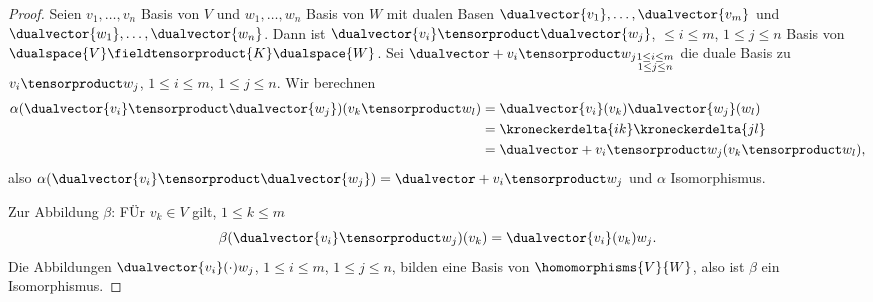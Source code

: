 \begin{proof}
  Seien \( v_1,\dotsc,v_n \) Basis von \( V \) und \( w_1,\dotsc,w_n \) Basis von \( W \) mit dualen Basen \( \dualvector{v_1},\dotsc, \dualvector{v_m} \) und \( \dualvector{w_1},\dotsc, \dualvector{w_n} \). Dann ist \( \dualvector{v_i}\tensorproduct\dualvector{w_j} \), \( \leq i \leq  m\), \( 1\leq j \leq n \) Basis von \( \dualspace{V}\fieldtensorproduct{K}\dualspace{W} \). Sei \( \dualvector+{v_i\tensorproduct w_j}_{\substack{1\leq i\leq m\\ 1\leq j\leq n}} \) die duale Basis zu  \( v_i\tensorproduct w_j \), \( 1\leq i\leq m\), \( 1\leq j\leq n \). Wir berechnen
  \begin{align*}
    \alpha(\dualvector{v_i}\tensorproduct \dualvector{w_j})(v_k\tensorproduct w_l)
    &=\dualvector{v_i}(v_k)\dualvector{w_j}(w_l)\\
    &=\kroneckerdelta{ik}\kroneckerdelta{jl}\\
    &=\dualvector+{v_i\tensorproduct w_j}(v_k\tensorproduct w_l),
  \end{align*}
  also \( \alpha(\dualvector{v_i}\tensorproduct\dualvector{w_j})=\dualvector+{v_i\tensorproduct w_j} \) und \( \alpha \) Isomorphismus.

  Zur Abbildung \( \beta\): FÜr \( v_k \in V \) gilt, \( 1\leq k\leq m \)
  \begin{equation*}
    \beta(\dualvector{v_i}\tensorproduct w_j)(v_k)=\dualvector{v_i}(v_k)w_j.
  \end{equation*}
  Die Abbildungen \( \dualvector{v_i}(\cdot)w_j \), \( 1\leq i\leq m \), \( 1\leq j \leq n \), bilden eine Basis von \( \homomorphisms{V}{W} \), also ist \( \beta \) ein Isomorphismus.  
\end{proof}
